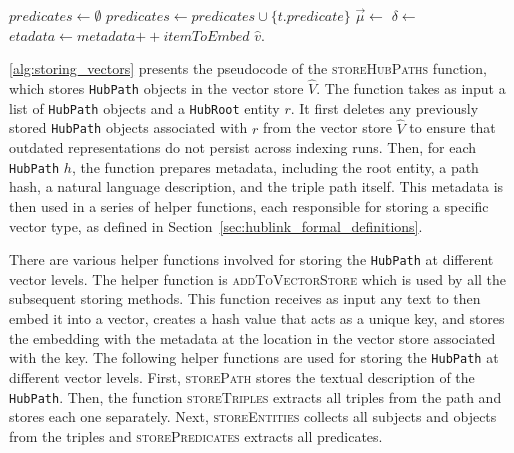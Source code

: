 \begin{algorithm}
\begin{algorithmic}[1]
\Statex
{}
    \State $predicates \gets \emptyset$ 
        \State $predicates \gets predicates \cup \{t.predicate\}$
    \EndFor
        \State {} 
    \EndFor
\EndProcedure
\Statex
{}
    \State $\vec{\mu} \gets$  
    \State $\delta \gets$  
    \State $etadata \gets metadata \mathbin{++} itemToEmbed$ 
    \State $\hat{v}$. 
\EndProcedure
\end{algorithmic}
\end{algorithm}

\autoref{alg:storing_vectors} presents the pseudocode of the \textsc{storeHubPaths} function, which stores \texttt{HubPath} objects in the vector store \(\hat{V}\). The function takes as input a list of \texttt{HubPath} objects and a \texttt{HubRoot} entity $r$. It first deletes any previously stored \texttt{HubPath} objects associated with \(r\) from the vector store \(\hat{V}\) to ensure that outdated representations do not persist across indexing runs. Then, for each \texttt{HubPath} \(h\), the function prepares metadata, including the root entity, a path hash, a natural language description, and the triple path itself. This metadata is then used in a series of helper functions, each responsible for storing a specific vector type, as defined in Section~\ref{sec:hublink_formal_definitions}.

There are various helper functions involved for storing the \texttt{HubPath} at different vector levels. The helper function is \textsc{addToVectorStore} which is used by all the subsequent storing methods. This function receives as input any text to then embed it into a vector, creates a hash value that acts as a unique key, and stores the embedding with the metadata at the location in the vector store associated with the key. The following helper functions are used for storing the \texttt{HubPath} at different vector levels. First, \textsc{storePath} stores the textual description of the \texttt{HubPath}. Then, the function \textsc{storeTriples} extracts all triples from the path and stores each one separately. Next, \textsc{storeEntities} collects all subjects and objects from the triples and \textsc{storePredicates} extracts all predicates.

